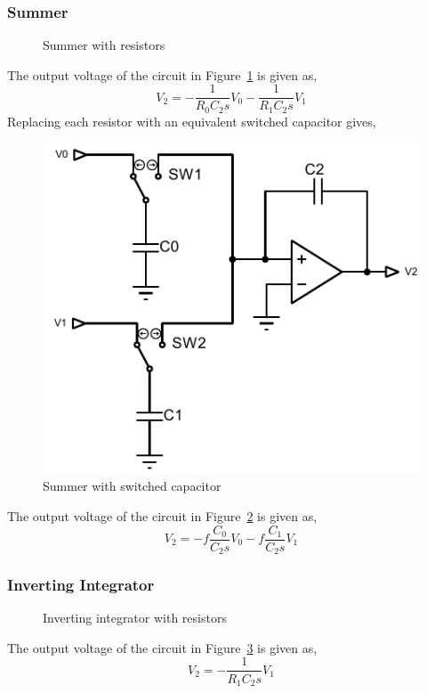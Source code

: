 \subsubsection*{Summer}
\begin{figure}[H]
    \centering
    \figsummer
    \caption{Summer with resistors}
    \label{fig:summer}
\end{figure}
The output voltage of the circuit in Figure~\ref{fig:summer} is given as,
\begin{equation}
    V_2=-\frac{1}{R_0C_2s}V_0-\frac{1}{R_1C_2s}V_1
\end{equation}
Replacing each resistor with an equivalent switched capacitor gives,
\begin{figure}[H]
    \centering
    \includegraphics{../Figures/summer}
    \caption{Summer with switched capacitor}
    \label{fig:summer-cap}
\end{figure}
The output voltage of the circuit in Figure~\ref{fig:summer-cap} is given as,
\begin{equation}
    V_2=-f\frac{C_0}{C_2s}V_0-f\frac{C_1}{C_2s}V_1
\end{equation}


\subsubsection*{Inverting Integrator}
\begin{figure}[H]
    \centering
    \figintegrator
    \caption{Inverting integrator with resistors}
    \label{fig:int}
\end{figure}
The output voltage of the circuit in Figure~\ref{fig:int} is given as,
\begin{equation}
    V_2=-\frac{1}{R_1C_2s}V_1
\end{equation}


